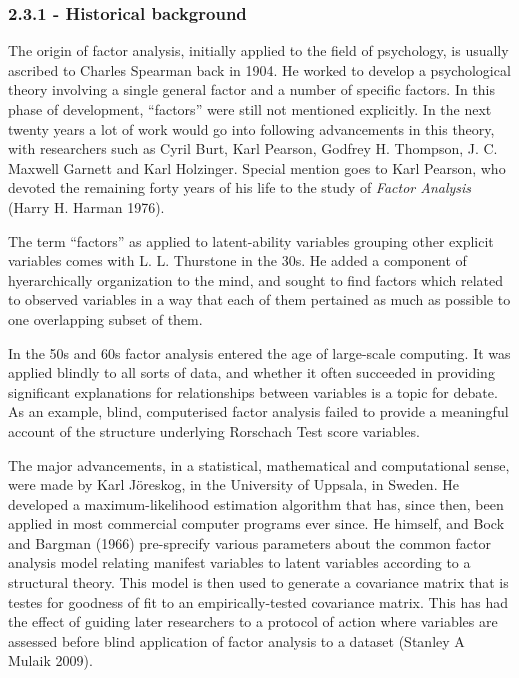 \documentclass[]{article}
\begin{document}
\subsubsection{2.3.1 - Historical
background}\label{historical-background-2}

The origin of factor analysis, initially applied to the field of
psychology, is usually ascribed to Charles Spearman back in 1904. He
worked to develop a psychological theory involving a single general
factor and a number of specific factors. In this phase of development,
``factors'' were still not mentioned explicitly. In the next twenty
years a lot of work would go into following advancements in this theory,
with researchers such as Cyril Burt, Karl Pearson, Godfrey H. Thompson,
J. C. Maxwell Garnett and Karl Holzinger. Special mention goes to Karl
Pearson, who devoted the remaining forty years of his life to the study
of \emph{Factor Analysis} (Harry H. Harman 1976).

The term ``factors'' as applied to latent-ability variables grouping
other explicit variables comes with L. L. Thurstone in the 30s. He added
a component of hyerarchically organization to the mind, and sought to
find factors which related to observed variables in a way that each of
them pertained as much as possible to one overlapping subset of them.

In the 50s and 60s factor analysis entered the age of large-scale
computing. It was applied blindly to all sorts of data, and whether it
often succeeded in providing significant explanations for relationships
between variables is a topic for debate. As an example, blind,
computerised factor analysis failed to provide a meaningful account of
the structure underlying Rorschach Test score variables.

The major advancements, in a statistical, mathematical and computational
sense, were made by Karl Jöreskog, in the University of Uppsala, in
Sweden. He developed a maximum-likelihood estimation algorithm that has,
since then, been applied in most commercial computer programs ever
since. He himself, and Bock and Bargman (1966) pre-sprecify various
parameters about the common factor analysis model relating manifest
variables to latent variables according to a structural theory. This
model is then used to generate a covariance matrix that is testes for
goodness of fit to an empirically-tested covariance matrix. This has had
the effect of guiding later researchers to a protocol of action where
variables are assessed before blind application of factor analysis to a
dataset (Stanley A Mulaik 2009).
\end{document}
